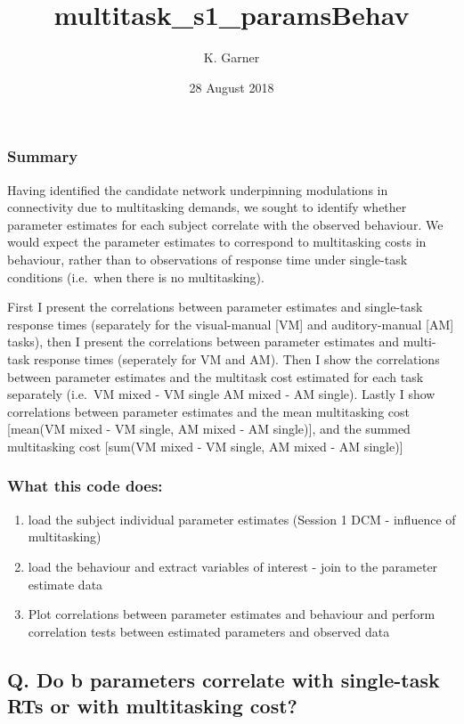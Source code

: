 \documentclass[]{article}
\title{multitask\_s1\_paramsBehav}
\author{K. Garner}
\date{28 August 2018}
\providecommand{\tightlist}{%
  \setlength{\itemsep}{0pt}\setlength{\parskip}{0pt}}
\begin{document}
\maketitle

\subsubsection{Summary}\label{summary}

Having identified the candidate network underpinning modulations in
connectivity due to multitasking demands, we sought to identify whether
parameter estimates for each subject correlate with the observed
behaviour. We would expect the parameter estimates to correspond to
multitasking costs in behaviour, rather than to observations of response
time under single-task conditions (i.e.~when there is no multitasking).

First I present the correlations between parameter estimates and
single-task response times (separately for the visual-manual {[}VM{]}
and auditory-manual {[}AM{]} tasks), then I present the correlations
between parameter estimates and multi-task response times (seperately
for VM and AM). Then I show the correlations between parameter estimates
and the multitask cost estimated for each task separately (i.e.~VM mixed
- VM single \textbar{} AM mixed - AM single). Lastly I show correlations
between parameter estimates and the mean multitasking cost {[}mean(VM
mixed - VM single, AM mixed - AM single){]}, and the summed multitasking
cost {[}sum(VM mixed - VM single, AM mixed - AM single){]}

\subsubsection{What this code does:}\label{what-this-code-does}

\begin{enumerate}
\def\labelenumi{\arabic{enumi}.}
\tightlist
\item
  load the subject individual parameter estimates (Session 1 DCM -
  influence of multitasking)
\item
  load the behaviour and extract variables of interest - join to the
  parameter estimate data
\item
  Plot correlations between parameter estimates and behaviour and
  perform correlation tests between estimated parameters and observed
  data
\end{enumerate}

\subsection{Q. Do b parameters correlate with single-task RTs or with
multitasking
cost?}\label{q.-do-b-parameters-correlate-with-single-task-rts-or-with-multitasking-cost}
\end{document}

